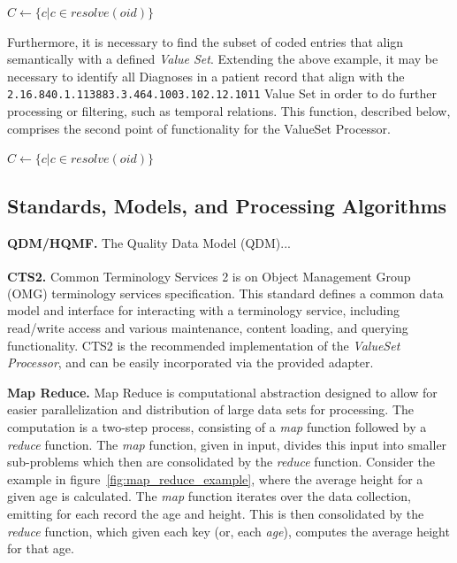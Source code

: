 \documentclass{amia}
\begin{document}
\begin{algorithm}
\begin{algorithmic}[1]
  \State $C \gets \{c | c \in resolve(oid)\}$
  \State {}
\EndProcedure
\end{algorithmic}
\end{algorithm}

Furthermore, it is necessary to find the subset of coded entries that align semantically with a defined  \textit{Value Set}. Extending the above example, it may be necessary to identify all Diagnoses in a patient record that align with the \texttt{2.16.840.1.113883.3.464.1003.102.12.1011} Value Set in order to do further processing or filtering, such as temporal relations. This function, described below, comprises the second point of functionality for the ValueSet Processor.

\begin{algorithm}
\begin{algorithmic}[1]
  \State $C \gets \{c | c \in resolve(oid)\}$
  \State {}
\EndProcedure
\end{algorithmic}
\end{algorithm}

\subsection*{Standards, Models, and Processing Algorithms}
\textbf{QDM/HQMF.}
The Quality Data Model (QDM)\cite{behilngquality}...

\textbf{CTS2.}
Common Terminology Services 2\cite{cts2} is on Object Management Group{\textsuperscript{\textregistered}} (OMG) terminology services specification. This standard defines a common data model and interface for interacting with a terminology service, including read/write access and various maintenance, content loading, and querying functionality. CTS2 is the recommended implementation of the \textit{ValueSet Processor}, and can be easily incorporated via the provided adapter.

\textbf{Map Reduce.}
Map Reduce is computational abstraction designed to allow for easier parallelization and distribution of large data sets for processing\cite{dean2008mapreduce}. The computation is a two-step process, consisting of a \textit{map} function followed by a \textit{reduce} function. The \textit{map} function, given in input, divides this input into smaller sub-problems which then are consolidated by the \textit{reduce} function. Consider the example in figure~\ref{fig:map_reduce_example}, where the average height for a given age is calculated. The \textit{map} function iterates over the data collection, emitting for each record the age and height. This is then consolidated by the \textit{reduce} function, which given each key (or, each \textit{age}), computes the average height for that age.
\end{document}
